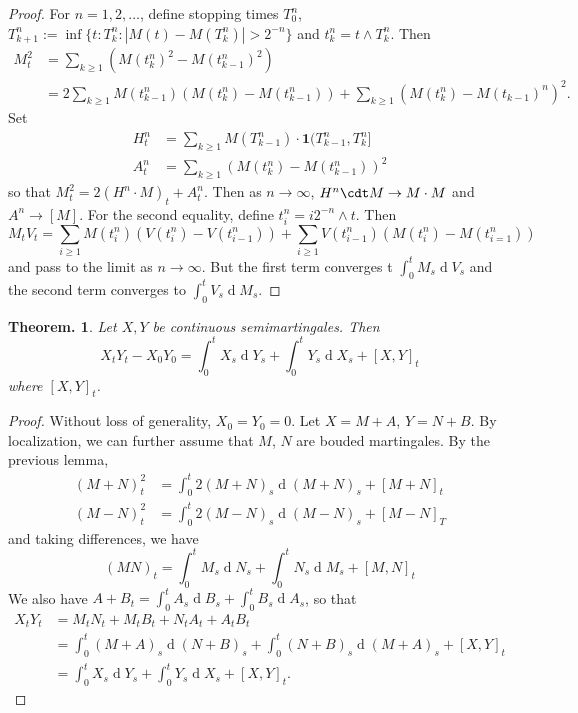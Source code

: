 \documentclass[11pt, a4paper]{memoir}
\theoremstyle{change}
\newtheorem{theorem}{Theorem.}[section]
\theoremstyle{plain}
\theoremstyle{nonumberplain}
\newtheorem{proof}{Proof}
\renewcommand{\d}[1]{\ensuremath{\operatorname{d}\!{#1}}}
\newcommand{\idc}{\mathbf{1}}
\numberwithin{equation}{section}
\begin{document}
\begin{proof}
    For $n=1,2,\ldots$, define stopping times $T_0^n$, $T_{k+1}^n:=\inf\{t:T_k^n:|M(t)-M(T_k^n)|>2^{-n}\}$ and $t_k^n=t\wedge T_k^n$.
    Then
    \begin{align*}
        M_t^2 &= \sum_{k\geq 1}(M(t_k^n)^2-M(t_{k-1}^n)^2)\\
              &= 2\sum_{k\geq 1}M(t_{k-1}^n)(M(t_k^n)-M(t_{k-1}^n))+\sum_{k\geq 1}(M(t_k^n)-M(t_{k-1})^n)^2.
    \end{align*}
    Set
    \begin{align*}
        H_t^n &= \sum_{k\geq 1}M(T_{k-1}^n)\cdot\idc{(T_{k-1}^n,T_k^n]}\\
        A_t^n &= \sum_{k\geq 1}(M(t_k^n)-M(t_{k-1}^n))^2
    \end{align*}
    so that $M_t^2=2(H^n\cdot M)_t+A_t^n$.
    Then as $n\to\infty$, $H^n\cdt M\to M\cdot M$ and $A^n\to [M]$.
    For the second equality, define $t_i^n=i2^{-n}\wedge t$.
    Then
    \begin{equation*}
        M_tV_t = \sum_{i\geq 1}M(t_i^n)(V(t_i^n)-V(t_{i-1}^n))+\sum_{i\geq 1}V(t_{i-1}^n)(M(t_i^n)-M(t_{i=1}^n))
    \end{equation*}
    and pass to the limit as $n\to\infty$.
    But the first term converges t $\int_0^t M_s\d{V_s}$ and the second term converges to $\int_0^t V_s\d{M_s}$.
\end{proof}
\begin{theorem}
    Let $X,Y$ be continuous semimartingales.
    Then
    \begin{equation*}
        X_tY_t-X_0Y_0=\int_0^tX_s\d{Y_s}+\int_0^t Y_s\d{X_s}+[X,Y]_t
    \end{equation*}
    where $[X,Y]_t$.
\end{theorem}
\begin{proof}
    Without loss of generality, $X_0=Y_0=0$.
    Let $X=M+A$, $Y=N+B$.
    By localization, we can further assume that $M$, $N$ are bouded martingales.
    By the previous lemma,
    \begin{align*}
        (M+N)_t^2 &= \int_0^t2(M+N)_s\d{(M+N)_s}+[M+N]_t\\
        (M-N)_t^2 &= \int_0^t 2(M-N)_s\d{(M-N)_s}+[M-N]_T
    \end{align*}
    and taking differences, we have
    \begin{equation*}
        (MN)_t = \int_0^t M_s\d{N_s} + \int_0^t N_s\d{M_s}+[M,N]_t
    \end{equation*}
    We also have $A+B_t=\int_0^tA_s\d{B_s}+\int_0^t B_s\d{A_s}$, so that
    \begin{align*}
        X_tY_t &= M_tN_t + M_tB_t+N_tA_t+A_tB_t\\
               &= \int_0^t(M+A)_s\d{(N+B)_s}+\int_0^t(N+B)_s\d{(M+A)_s}+[X,Y]_t\\
               &= \int_0^t X_s\d{Y_s}+\int_0^t Y_s\d{X_s}+[X,Y]_t.
    \end{align*}
\end{proof}
\end{document}
